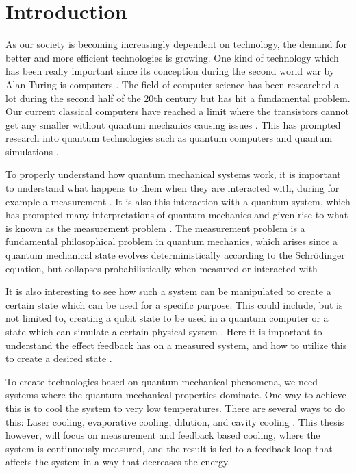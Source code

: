 \section{Introduction}
As our society is becoming increasingly dependent on technology, the demand for better and more efficient technologies is growing. One kind of technology which has been really important since its conception during the second world war by Alan Turing is computers \cite{Nielsen:2010}. The field of computer science has been researched a lot during the second half of the 20th century but has hit a fundamental problem. Our current classical computers have reached a limit where the transistors cannot get any smaller without quantum mechanics causing issues \cite{Nielsen:2010}. This has prompted research into quantum technologies such as quantum computers and quantum simulations \cite{Nielsen:2010}. 

To properly understand how quantum mechanical systems work, it is important to understand what happens to them when they are interacted with, during for example a measurement \cite{Jordan:2024}. It is also this interaction with a quantum system, which has prompted many interpretations of quantum mechanics and given rise to what is known as the measurement problem \cite{Jordan:2024}. The measurement problem is a fundamental philosophical problem in quantum mechanics, which arises since a quantum mechanical state evolves deterministically according to the Schrödinger equation, but collapses probabilistically when measured or interacted with \cite{Jordan:2024}.

It is also interesting to see how such a system can be manipulated to create a certain state which can be used for a specific purpose. This could include, but is not limited to, creating a qubit state to be used in a quantum computer or a state which can simulate a certain physical system \cite{Nielsen:2010}. Here it is important to understand the effect feedback has on a measured system, and how to utilize this to create a desired state \cite{Annby-Andersson:2024}.

To create technologies based on quantum mechanical phenomena, we need systems where the quantum mechanical properties dominate. One way to achieve this is to cool the system to very low temperatures. There are several ways to do this: Laser cooling, evaporative cooling, dilution, and cavity cooling \cite{De-Sousa:2025}. This thesis however, will focus on measurement and feedback based cooling, where the system is continuously measured, and the result is fed to a feedback loop that affects the system in a way that decreases the energy. 

